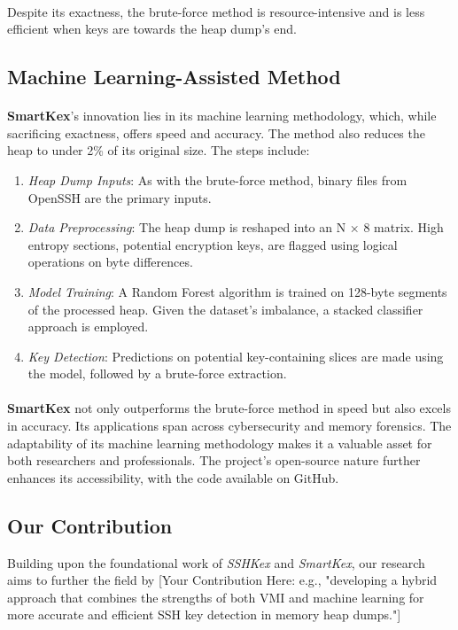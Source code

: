     \paragraph{}Despite its exactness, the brute-force method is resource-intensive and is less efficient when keys are towards the heap dump's end.

    \subsection{Machine Learning-Assisted Method}

    \paragraph{}\textbf{SmartKex}'s innovation lies in its machine learning methodology, which, while sacrificing exactness, offers speed and accuracy. The method also reduces the heap to under 2\% of its original size. The steps include:
    \begin{enumerate}
        \item \textit{Heap Dump Inputs}: As with the brute-force method, binary files from OpenSSH are the primary inputs.
        \item \textit{Data Preprocessing}: The heap dump is reshaped into an N × 8 matrix. High entropy sections, potential encryption keys, are flagged using logical operations on byte differences.
        \item \textit{Model Training}: A Random Forest algorithm is trained on 128-byte segments of the processed heap. Given the dataset's imbalance, a stacked classifier approach is employed.
        \item \textit{Key Detection}: Predictions on potential key-containing slices are made using the model, followed by a brute-force extraction.
    \end{enumerate}
    \paragraph{}\textbf{SmartKex} not only outperforms the brute-force method in speed but also excels in accuracy. Its applications span across cybersecurity and memory forensics. The adaptability of its machine learning methodology makes it a valuable asset for both researchers and professionals. The project's open-source nature further enhances its accessibility, with the code available on GitHub.
    

\subsection{Our Contribution}

Building upon the foundational work of \textit{SSHKex} and \textit{SmartKex}, our research aims to further the field by [Your Contribution Here: e.g., "developing a hybrid approach that combines the strengths of both VMI and machine learning for more accurate and efficient SSH key detection in memory heap dumps."]

